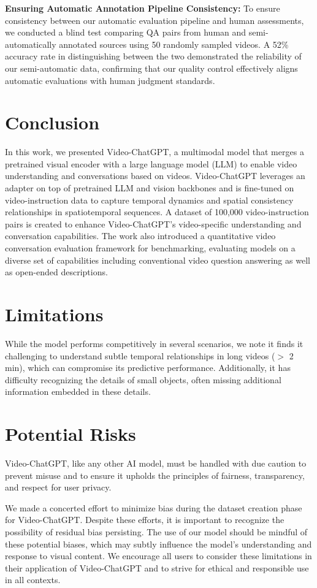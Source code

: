 \noindent
\textbf{Ensuring Automatic Annotation Pipeline Consistency:}
To ensure consistency between our automatic evaluation pipeline and human assessments, we conducted a blind test comparing QA pairs from human and semi-automatically annotated sources using 50 randomly sampled videos. A 52\% accuracy rate in distinguishing between the two demonstrated the reliability of our semi-automatic data, confirming that our quality control effectively aligns automatic evaluations with human judgment standards.

\section{Conclusion}
In this work, we presented Video-ChatGPT, a multimodal model that merges a pretrained visual encoder with a large language model (LLM) to enable video understanding and conversations based on videos. Video-ChatGPT leverages an adapter on top of pretrained LLM and vision backbones and is fine-tuned on video-instruction data to capture temporal dynamics and spatial consistency relationships in spatiotemporal sequences. A dataset of 100,000 video-instruction pairs is created to enhance Video-ChatGPT's video-specific understanding and conversation capabilities. The work also introduced a quantitative video conversation evaluation framework for benchmarking, evaluating models on a diverse set of capabilities including conventional video question answering as well as open-ended descriptions.

\section{Limitations}
While the model performs competitively in several scenarios, we note it finds it challenging to understand subtle temporal relationships in long videos ($>$ 2 min), which can compromise its predictive performance. Additionally, it has difficulty recognizing the details of small objects, often missing additional information embedded in these details.

\section{Potential Risks}
Video-ChatGPT, like any other AI model, must be handled with due caution to prevent misuse and to ensure it upholds the principles of fairness, transparency, and respect for user privacy. 

We made a concerted effort to minimize bias during the dataset creation phase for Video-ChatGPT. Despite these efforts, it is important to recognize the possibility of residual bias persisting. The use of our model should be mindful of these potential biases, which may subtly influence the model's understanding and response to visual content. We encourage all users to consider these limitations in their application of Video-ChatGPT and to strive for ethical and responsible use in all contexts.

